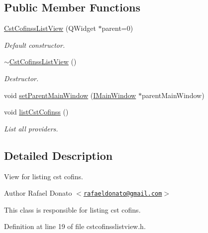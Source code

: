 \subsection*{\-Public \-Member \-Functions}
\begin{DoxyCompactItemize}
\item 
\hyperlink{class_cst_cofinss_list_view_a0f5e3789fed3fff04645382a5a695b03}{\-Cst\-Cofinss\-List\-View} (\-Q\-Widget $\ast$parent=0)
\begin{DoxyCompactList}\small\item\em \-Default constructor. \end{DoxyCompactList}\item 
\hyperlink{class_cst_cofinss_list_view_aa0d2132e2fef4830178e2b5a9d01d3b1}{$\sim$\-Cst\-Cofinss\-List\-View} ()
\begin{DoxyCompactList}\small\item\em \-Destructor. \end{DoxyCompactList}\item 
void \hyperlink{class_cst_cofinss_list_view_a9401036efd8e5a38f520b4775a37f59d}{set\-Parent\-Main\-Window} (\hyperlink{class_i_main_window}{\-I\-Main\-Window} $\ast$parent\-Main\-Window)
\item 
void \hyperlink{class_cst_cofinss_list_view_a45d081a2fa3b67bae335ee5d832a84f4}{list\-Cst\-Cofinss} ()
\begin{DoxyCompactList}\small\item\em \-List all providers. \end{DoxyCompactList}\end{DoxyCompactItemize}


\subsection{\-Detailed \-Description}
\-View for listing cst cofins. 

\begin{DoxyAuthor}{\-Author}
\-Rafael \-Donato $<$\href{mailto:rafaeldonato@gmail.com}{\tt rafaeldonato@gmail.\-com}$>$
\end{DoxyAuthor}
\-This class is responsible for listing cst cofins. 

\-Definition at line 19 of file cstcofinsslistview.\-h.



